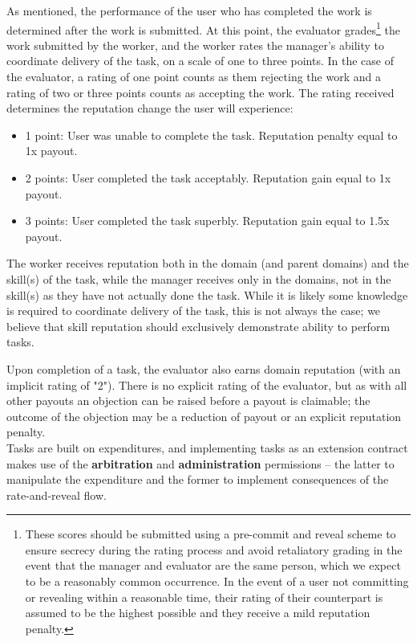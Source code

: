 As mentioned, the performance of the user who has completed the work is determined after the work is submitted. At this point, the evaluator grades\footnote{These scores should be submitted using a pre-commit and reveal scheme to ensure secrecy during the rating process and avoid retaliatory grading in the event that the manager and evaluator are the same person, which we expect to be a reasonably common occurrence. In the event of a user not committing or revealing within a reasonable time, their rating of their counterpart is assumed to be the highest possible and they receive a mild reputation penalty.} the work submitted by the worker, and the worker rates the manager's ability to coordinate delivery of the task, on a scale of one to three points. In the case of the evaluator, a rating of one point counts as them rejecting the work and a rating of two or three points counts as accepting the work. The rating received determines the reputation change the user will experience:

\begin{itemize}
 \item[]1 point:\phantom{s} User was unable to complete the task. Reputation penalty equal to 1x payout.
 \item[]2 points: User completed the task acceptably. Reputation gain equal to 1x payout.
 \item[]3 points: User completed the task superbly. Reputation gain equal to 1.5x payout.
\end{itemize}

The worker receives reputation both in the domain (and parent domains) and the skill(s) of the task, while the manager receives only in the domains, not in the skill(s) as they have not actually done the task. While it is likely some knowledge is required to coordinate delivery of the task, this is not always the case; we believe that skill reputation should exclusively demonstrate ability to perform tasks.

Upon completion of a task, the evaluator also earns domain reputation (with an implicit rating of "2"). There is no explicit rating of the evaluator, but as with all other payouts an objection can be raised before a payout is claimable; the outcome of the objection may be a reduction of payout or an explicit reputation penalty. \\

Tasks are built on expenditures, and implementing tasks as an extension contract makes use of the \textbf{arbitration} and \textbf{administration} permissions -- the latter to manipulate the expenditure and the former to implement consequences of the rate-and-reveal flow.

